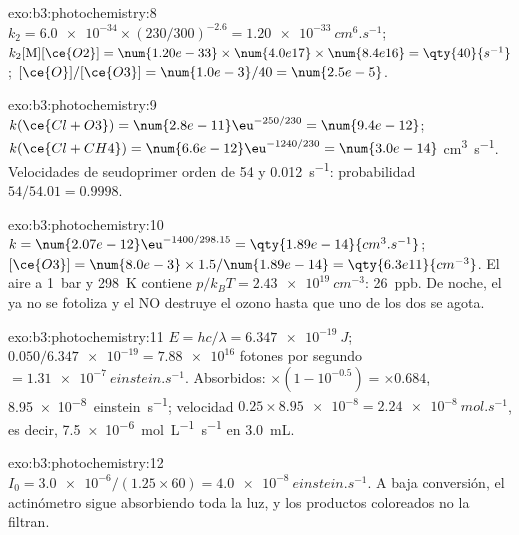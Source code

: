 \begin{solution}{exo:b3:photochemistry:8}
$k_2 = \num{6.0e-34} \times (230/300)^{-2.6} = \qty{1.20e-33}{cm^6.s^{-1}}$; $k_2[\mathrm M][\ce{O2}] = \num{1.20e-33} \times
\num{4.0e17} \times \num{8.4e16} = \qty{40}{s^{-1}}$; $[\ce{O}]/[\ce{O3}] = \num{1.0e-3}/40 = \num{2.5e-5}$.
\end{solution}

\begin{solution}{exo:b3:photochemistry:9}
$k(\ce{Cl + O3}) = \num{2.8e-11}\eu^{-250/230} = \num{9.4e-12}$; $k(\ce{Cl + CH4}) = \num{6.6e-12}\eu^{-1240/230} = \num{3.0e-14}$
\unit{cm^3.s^{-1}}. Velocidades de seudoprimer orden de 54 y \qty{0.012}{s^{-1}}: probabilidad $54/54.01 = 0.9998$.
\end{solution}

\begin{solution}{exo:b3:photochemistry:10}
$k = \num{2.07e-12}\eu^{-1400/298.15} = \qty{1.89e-14}{cm^3.s^{-1}}$; $[\ce{O3}] = \num{8.0e-3} \times 1.5/\num{1.89e-14} =
\qty{6.3e11}{cm^{-3}}$. El aire a \qty{1}{bar} y \qty{298}{K} contiene $p/k_BT = \qty{2.43e19}{cm^{-3}}$: \qty{26}{ppb}. De noche,
el  ya no se fotoliza y el NO destruye el ozono hasta que uno de los dos se agota.
\end{solution}

\begin{solution}{exo:b3:photochemistry:11}
$E = hc/\lambda = \qty{6.347e-19}{J}$; $0.050/\num{6.347e-19} = \num{7.88e16}$ fotones por segundo $= \qty{1.31e-7}{einstein.s^{-1}}$.
Absorbidos: $\times(1 - 10^{-0.5}) = \times0.684$, \qty{8.95e-8}{einstein.s^{-1}}; velocidad $0.25 \times \num{8.95e-8} =
\qty{2.24e-8}{mol.s^{-1}}$, es decir, \qty{7.5e-6}{mol.L^{-1}.s^{-1}} en \qty{3.0}{mL}.
\end{solution}

\begin{solution}{exo:b3:photochemistry:12}
$I_0 = \num{3.0e-6}/(1.25 \times 60) = \qty{4.0e-8}{einstein.s^{-1}}$. A baja conversión, el actinómetro
sigue absorbiendo toda la luz, y los productos coloreados no la filtran.
\end{solution}

